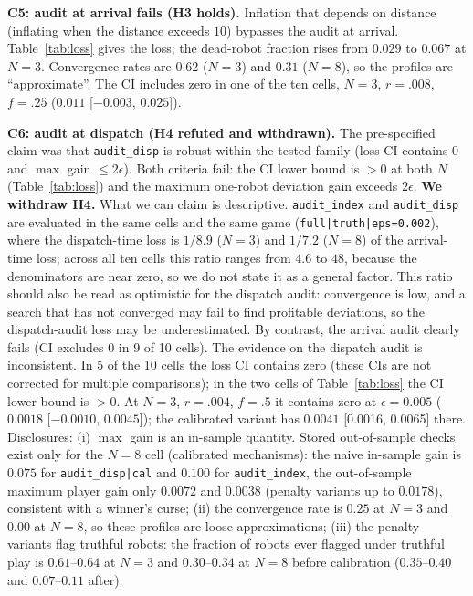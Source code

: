 \documentclass[10pt]{article}
\begin{document}
\textbf{C5: audit at arrival fails (H3 holds).} Inflation that depends on distance (inflating when the distance exceeds $10$) bypasses the audit at arrival. Table~\ref{tab:loss} gives the loss; the dead-robot fraction rises from $0.029$ to $0.067$ at $N{=}3$. Convergence rates are $0.62$ ($N{=}3$) and $0.31$ ($N{=}8$), so the profiles are ``approximate''. The CI includes zero in one of the ten cells, $N{=}3$, $r{=}.008$, $f{=}.25$ ($0.011$ [$-0.003$, $0.025$]).

\textbf{C6: audit at dispatch (H4 refuted and withdrawn).} The pre-specified claim was that \texttt{audit\_disp} is robust within the tested family (loss CI contains $0$ and $\max$ gain $\le2\epsilon$). Both criteria fail: the CI lower bound is $>0$ at both $N$ (Table~\ref{tab:loss}) and the maximum one-robot deviation gain exceeds $2\epsilon$. \textbf{We withdraw H4.} What we can claim is descriptive. \texttt{audit\_index} and \texttt{audit\_disp} are evaluated in the same cells and the same game (\texttt{full|truth|eps=0.002}), where the dispatch-time loss is $1/8.9$ ($N{=}3$) and $1/7.2$ ($N{=}8$) of the arrival-time loss; across all ten cells this ratio ranges from $4.6$ to $48$, because the denominators are near zero, so we do not state it as a general factor. This ratio should also be read as optimistic for the dispatch audit: convergence is low, and a search that has not converged may fail to find profitable deviations, so the dispatch-audit loss may be underestimated. By contrast, the arrival audit clearly fails (CI excludes $0$ in 9 of 10 cells). The evidence on the dispatch audit is inconsistent. In 5 of the 10 cells the loss CI contains zero (these CIs are not corrected for multiple comparisons); in the two cells of Table~\ref{tab:loss} the CI lower bound is $>0$. At $N{=}3$, $r{=}.004$, $f{=}.5$ it contains zero at $\epsilon=0.005$ ($0.0018$ [$-0.0010$, $0.0045$]); the calibrated variant has $0.0041$ [0.0016, 0.0065] there. Disclosures: (i) $\max$ gain is an in-sample quantity. Stored out-of-sample checks exist only for the $N{=}8$ cell (calibrated mechanisms): the naive in-sample gain is $0.075$ for \texttt{audit\_disp|cal} and $0.100$ for \texttt{audit\_index}, the out-of-sample maximum player gain only $0.0072$ and $0.0038$ (penalty variants up to $0.0178$), consistent with a winner's curse; (ii) the convergence rate is $0.25$ at $N{=}3$ and $0.00$ at $N{=}8$, so these profiles are loose approximations; (iii) the penalty variants flag truthful robots: the fraction of robots ever flagged under truthful play is $0.61$--$0.64$ at $N{=}3$ and $0.30$--$0.34$ at $N{=}8$ before calibration ($0.35$--$0.40$ and $0.07$--$0.11$ after).
\end{document}
